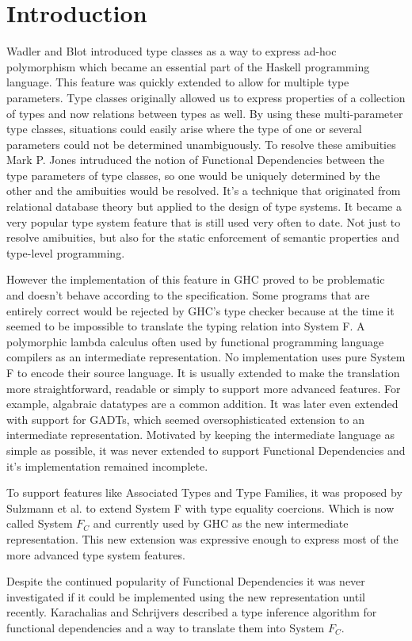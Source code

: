\section{Introduction}
Wadler and Blot \cite{Wadler:1989:MAP:75277.75283} introduced type classes as a
way to express ad-hoc polymorphism which became an essential part of the Haskell
programming language. This feature was quickly extended to allow for multiple
type parameters. Type classes originally allowed us to express properties of a
collection of types and now relations between types as well. By using
these multi-parameter type classes, situations could easily arise where the type
of one or several parameters could not be determined unambiguously. To resolve
these amibuities Mark P. Jones intruduced the notion of Functional Dependencies
\cite{Jones00typeclasses} between the type parameters of type classes, so one
would be uniquely determined by the other and the amibuities would be resolved.
It's a technique that originated from relational database theory but applied to
the design of type systems. It became a very popular type system feature that is
still used very often to date. Not just to resolve amibuities, but also for the
static enforcement of semantic properties and type-level programming.

However the implementation of this feature in GHC proved to be problematic and
doesn't behave according to the specification.  Some programs that are entirely
correct
would be rejected by GHC's type checker because at the time it seemed to be
impossible to translate the typing relation into System F. A polymorphic
lambda calculus often used by functional programming language compilers as an
intermediate representation. No implementation uses pure System F to encode
their source language. It is usually extended to make the translation more
straightforward, readable or simply to support more advanced features. For
example, algabraic datatypes are a common addition. It was later even extended
with support for GADTs, which seemed oversophisticated extension to an
intermediate representation. Motivated by
keeping the intermediate language as simple as possible, it was never extended
to support Functional Dependencies and it's implementation remained incomplete.

To support features like Associated Types and Type Families, it was proposed by
Sulzmann et al. \cite{Sulzmann:2007:SFT:1190315.1190324} to extend System F with
type equality coercions. Which is now called System $F_C$ and currently used by
GHC as the new intermediate representation. This new extension was expressive
enough to express most of the more advanced type system features.

Despite the continued popularity of Functional Dependencies it was never
investigated if it could be implemented using the new representation until
recently. Karachalias and Schrijvers \cite{Karachalias:2017:EFD:3122955.3122966}
described a type inference algorithm for functional dependencies and a way to
translate them into System $F_C$.
